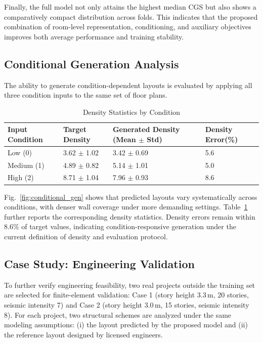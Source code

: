 Finally, the full model not only attains the highest median CGS but also shows a comparatively compact distribution across folds. This indicates that the proposed combination of room-level representation, conditioning, and auxiliary objectives improves both average performance and training stability.



\subsection{Conditional Generation Analysis}
\label{subsec:conditional_analysis}

The ability to generate condition-dependent layouts is evaluated by applying all three condition inputs to the same set of floor plans.

\begin{table}[t]
\centering
\caption{Density Statistics by Condition}
\label{tab:density_stats}
\begin{tabularx}{\textwidth}{XXXX}
\toprule
Input Condition & Target Density & Generated Density \newline (Mean $\pm$ Std) & Density Error(\%) \\
\midrule
Low (0) & 3.62 $\pm$ 1.02 & 3.42 $\pm$ 0.69 & 5.6 \\
Medium (1) & 4.89 $\pm$ 0.82 & 5.14 $\pm$ 1.01 & 5.0 \\
High (2) & 8.71 $\pm$ 1.04 & 7.96 $\pm$ 0.93 & 8.6 \\
\bottomrule
\end{tabularx}
\end{table}

Fig.~\ref{fig:conditional_gen} shows that predicted layouts vary systematically across conditions, with denser wall coverage under more demanding settings. Table~\ref{tab:density_stats} further reports the corresponding density statistics. Density errors remain within 8.6\% of target values, indicating condition-responsive generation under the current definition of density and evaluation protocol.



\subsection{Case Study: Engineering Validation}
\label{subsec:case_study}

To further verify engineering feasibility, two real projects outside the training set are selected for finite-element validation: Case 1 (story height 3.3\,m, 20 stories, seismic intensity 7) and Case 2 (story height 3.0\,m, 15 stories, seismic intensity 8). For each project, two structural schemes are analyzed under the same modeling assumptions: (i) the layout predicted by the proposed model and (ii) the reference layout designed by licensed engineers.

